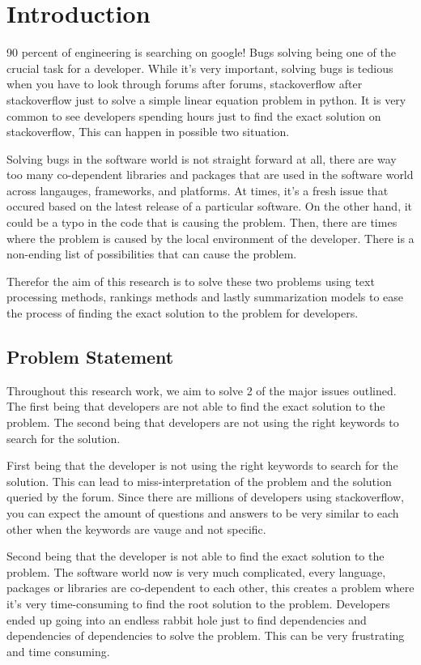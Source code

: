 \chapter{Introduction}
90 percent of engineering is searching on google! Bugs solving being one of the crucial task for a developer. While it's very important, solving bugs is tedious when you have to look through forums after forums, stackoverflow after stackoverflow just to solve a simple linear equation problem in python. It is very common to see developers spending hours just to find the exact solution on stackoverflow, This can happen in possible two situation. 

Solving bugs in the software world is not straight forward at all, there are way too many co-dependent libraries and packages that are used in the software world across langauges, frameworks, and platforms. At times, it's a fresh issue that occured based on the latest release of a particular software. On the other hand, it could be a typo in the code that is causing the problem. Then, there are times where the problem is caused by the local environment of the developer. There is a non-ending list of possibilities that can cause the problem.

Therefor the aim of this research is to solve these two problems using text processing methods, rankings methods and lastly summarization models to ease the process of finding the exact solution to the problem for developers.





\vspace{1cm}
\section{Problem Statement}
Throughout this research work, we aim to solve 2 of the major issues outlined. The first being that developers are not able to find the exact solution to the problem. The second being that developers are not using the right keywords to search for the solution.

First being that the developer is not using the right keywords to search for the solution. This can lead to miss-interpretation of the problem and the solution queried by the forum. Since there are millions of developers using stackoverflow, you can expect the amount of questions and answers to be very similar to each other when the keywords are vauge and not specific. 

Second being that the developer is not able to find the exact solution to the problem. The software world now is very much complicated, every language, packages or libraries are co-dependent to each other, this creates a problem where it's very time-consuming to find the root solution to the problem. Developers ended up going into an endless rabbit hole just to find dependencies and dependencies of dependencies to solve the problem. This can be very frustrating and time consuming.
